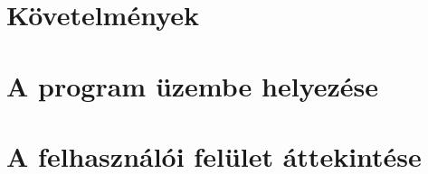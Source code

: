 
\section{Követelmények}

\section{A program üzembe helyezése}



\section{A felhasználói felület áttekintése}

